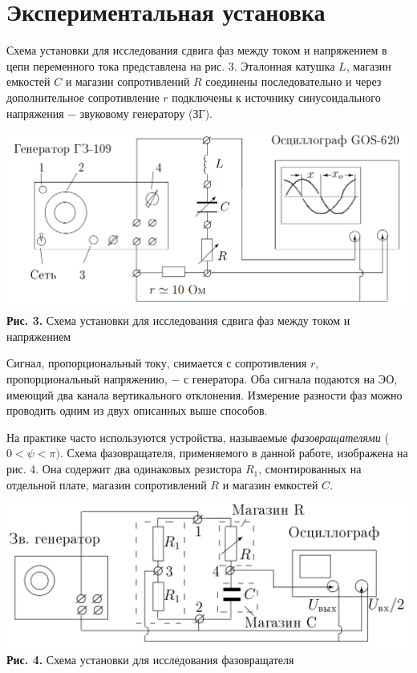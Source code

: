 \documentclass[a4paper,12pt]{article} %
\begin{document}
\section{Экспериментальная установка}
\hfill \break Схема установки для исследования сдвига фаз между током и напряжением в цепи переменного тока представлена на рис. 3. Эталонная катушка $L$, магазин емкостей $C$ и магазин сопротивлений $R$ соединены последовательно и через дополнительное сопротивление $r$ подключены к источнику синусоидального напряжения $-$ звуковому генератору (ЗГ).

\begin{center}
\includegraphics[width=0.85\linewidth]{3.2.1_3.png}\\
\textbf{Рис. 3.} Схема установки для исследования сдвига фаз между током и напряжением\\
\end{center}

\hfill \break Сигнал, пропорциональный току, снимается с сопротивления $r$, пропорциональный напряжению, $-$ с генератора. Оба сигнала подаются на ЭО, имеющий два канала вертикального отклонения. Измерение разности фаз можно проводить одним из двух описанных выше способов.

\hfill \break На практике часто используются устройства, называемые \textit{фазовращателями} ($0 < \psi < \pi)$. Схема фазовращателя, применяемого в данной работе, изображена на рис. 4. Она содержит два одинаковых резистора $R_{1}$, смонтированных на отдельной плате, магазин сопротивлений $R$ и магазин емкостей $C$.

\begin{center}
\includegraphics[width=0.85\linewidth]{3.2.1_4.png}\\
\textbf{Рис. 4.} Схема установки для исследования фазовращателя\\
\end{center}
\end{document}
